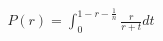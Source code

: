 \documentclass[preview]{standalone}
\begin{document}
\begin{align*}
P(r)= \int_{0}^{1-r-\frac{1}{n}} \frac{r}{r+t} dt
\end{align*}
\end{document}
